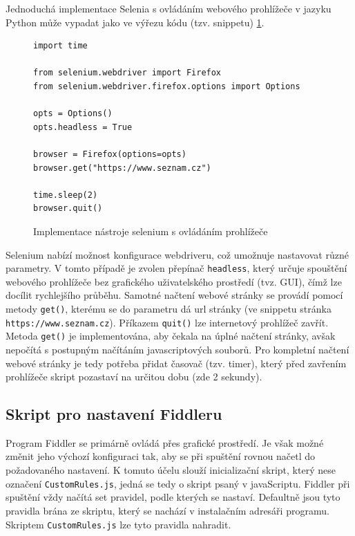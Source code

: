 \documentclass[thesis=M,czech,hidelinks]{FITthesis}[2013/05/06]
\begin{document}
Jednoduchá implementace Selenia s ovládáním webového prohlížeče v jazyku Python může vypadat jako ve výřezu kódu (tzv. snippetu) \ref{snip:selenium}.

\begin{figure}[h]               
\begin{verbatim}
import time

from selenium.webdriver import Firefox
from selenium.webdriver.firefox.options import Options

opts = Options()
opts.headless = True

browser = Firefox(options=opts)
browser.get("https://www.seznam.cz")

time.sleep(2)
browser.quit()
\end{verbatim}      
\caption{Implementace nástroje selenium s ovládáním prohlížeče}
\label{snip:selenium}
\end{figure}
Selenium nabízí možnost konfigurace webdriveru, což umožnuje nastavovat různé parametry. V tomto případě je zvolen přepínač \texttt{headless}, který určuje spouštění webového prohlížeče bez grafického uživatelského prostředí (tvz. GUI), čímž lze docílit rychlejšího průběhu. Samotné načtení webové stránky se provádí pomocí metody \texttt{get()}, kterému se do parametru dá url stránky (ve snippetu stránka \texttt{https://www.seznam.cz}). Příkazem \texttt{quit()} lze internetový prohlížeč zavřít. Metoda \texttt{get()} je implementována, aby čekala na úplné načtení stránky, avšak nepočítá s postupným načítáním javascriptových souborů. Pro kompletní načtení webové stránky je tedy potřeba přidat časovač (tzv. timer), který před zavřením prohlížeče skript pozastaví na určitou dobu (zde 2 sekundy).




\subsection{Skript pro nastavení Fiddleru}\label{sec:fiddler_setup}
Program Fiddler se primárně ovládá přes grafické prostředí. Je však možné změnit jeho výchozí konfiguraci tak, aby se při spuštění rovnou načetl do požadovaného nastavení. K tomuto účelu slouží inicializační skript, který nese označení \texttt{CustomRules.js}, jedná se tedy o skript psaný v javaScriptu. Fiddler při spuštění vždy načítá set pravidel, podle kterých se nastaví. Defaultně jsou tyto pravidla brána ze skriptu, který se nachází v instalačním adresáři programu. Skriptem \texttt{CustomRules.js} lze tyto pravidla nahradit.
\end{document}
